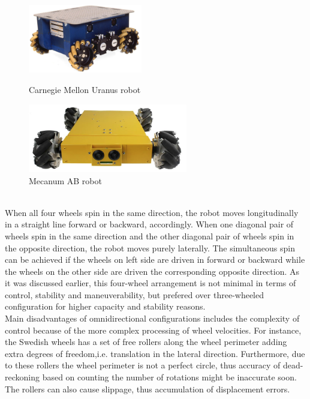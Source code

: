 \documentclass[12pt,english]{article}
\begin{document}
\begin{figure}[htb!]
	\centering
	\centering
	\includegraphics[height=3cm]{figures/uranus}
	\caption{Carnegie Mellon Uranus robot}
	\endminipage\hfill
	\centering
	\includegraphics[height=3cm]{figures/mecanum}
	\caption{Mecanum AB robot}
	\label{mecanum}
	\endminipage\hfill
\end{figure} \\
When all four wheels spin in the same direction, the robot moves longitudinally in a straight line forward or backward, accordingly. When one diagonal pair of wheels spin in the same direction and the other diagonal pair of wheels spin in the opposite direction, the robot moves purely laterally. The simultaneous spin can be achieved if the wheels on left side are driven in forward or backward while the wheels on the other side are driven the corresponding opposite direction. As it was discussed earlier, this four-wheel arrangement is not minimal in terms of control, stability and maneuverability, but prefered over three-wheeled configuration for higher capacity and stability reasons. \\[10pt]
Main disadvantages of omnidirectional configurations includes the complexity of control because of the more complex processing of wheel velocities. For instance, the Swedish wheels has a set of free rollers along the wheel perimeter adding extra degrees of freedom,i.e. translation in the lateral direction. Furthermore, due to these rollers the wheel perimeter is not a perfect circle, thus accuracy of dead-reckoning based on counting the number of rotations might be inaccurate soon. The rollers can also cause slippage, thus accumulation of displacement errors.
\end{document}
